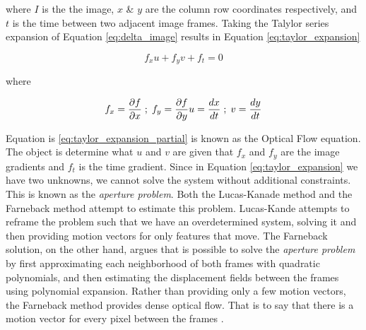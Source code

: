 where $I$ is the the image, $x$ \& $y$ are the column row coordinates
respectively, and $t$ is the time between two adjacent image frames. Taking the
Talylor series expansion of Equation \ref{eq:delta_image} results in Equation
\ref{eq:taylor_expansion}


\begin{equation}
f_x u + f_y v + f_t = 0
\label{eq:taylor_expansion}
\end{equation}

where

\begin{equation}
f_x = \frac{\partial f}{\partial x} \; ; \; f_y = \frac{\partial f}{\partial y} \\
u = \frac{dx}{dt} \; ; \; v = \frac{dy}{dt}
\label{eq:taylor_expansion_partial}
\end{equation}

 Equation is \ref{eq:taylor_expansion_partial} is known as the Optical Flow
 equation. The object is determine what $u$ and $v$ are given that $f_x$ and
 $f_y$ are the image gradients and $f_t$ is the time gradient. Since in Equation
 \ref{eq:taylor_expansion} we have two unknowns, we cannot solve the system
 without additional constraints. This is known as the \textit{aperture problem}.
 Both the Lucas-Kanade method and the Farneback method attempt to estimate this
 problem. Lucas-Kande attempts to reframe the problem such that we have an
 overdetermined system, solving it and then providing motion vectors for only
 features that move. The Farneback solution, on the other hand, argues that is
 possible to solve the \textit{aperture problem} by first approximating each
 neighborhood of both frames with quadratic polynomials, and then estimating the
 displacement fields between the frames using polynomial expansion. Rather than
 providing only a few motion vectors, the Farneback method provides dense
 optical flow. That is to say that there is a motion vector for every pixel
 between the frames \cite{farneback2003two}.

